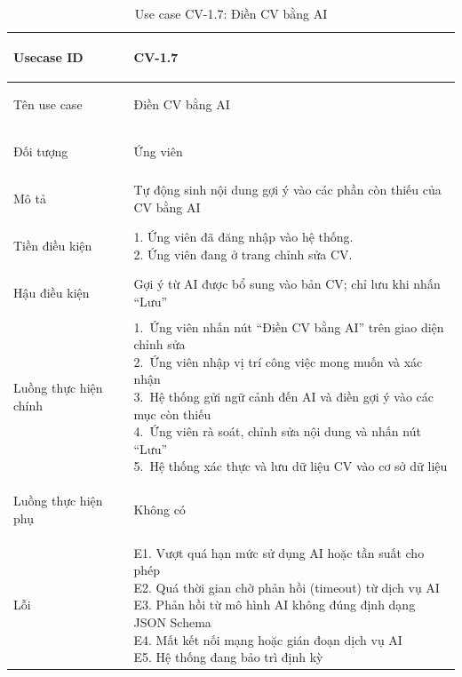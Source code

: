 \begin{table}[H]
    \centering
    \small
    \renewcommand{\arraystretch}{0.90}
    \begin{tabularx}{\textwidth}{|
        >{\bfseries\raggedright\arraybackslash}p{2.6cm}|Y|}
        \hline

        Usecase ID & CV-1.7 \\ \hline

        Tên use case & Điền CV bằng AI \\ \hline

        Đối tượng & Ứng viên \\ \hline

        Mô tả & Tự động sinh nội dung gợi ý vào các phần còn thiếu của CV bằng AI \\ \hline

        Tiền điều kiện &
        \parbox[t]{\hsize}{
            1. Ứng viên đã đăng nhập vào hệ thống.\\
            2. Ứng viên đang ở trang chỉnh sửa CV.
        } \\
        \hline

        Hậu điều kiện & Gợi ý từ AI được bổ sung vào bản CV; chỉ lưu khi nhấn ``Lưu'' \\ \hline

        Luồng thực hiện chính &
        \parbox[t]{\hsize}{
            1.\ Ứng viên nhấn nút ``Điền CV bằng AI'' trên giao diện chỉnh sửa\\
            2.\ Ứng viên nhập vị trí công việc mong muốn và xác nhận\\
            3.\ Hệ thống gửi ngữ cảnh đến AI và điền gợi ý vào các mục còn thiếu\\
            4.\ Ứng viên rà soát, chỉnh sửa nội dung và nhấn nút ``Lưu''\\
            5.\ Hệ thống xác thực và lưu dữ liệu CV vào cơ sở dữ liệu
        }\\
        \hline

        Luồng thực hiện phụ & Không có \\
        \hline

        Lỗi &
        \parbox[t]{\hsize}{
            E1. Vượt quá hạn mức sử dụng AI hoặc tần suất cho phép\\
            E2. Quá thời gian chờ phản hồi (timeout) từ dịch vụ AI\\
            E3. Phản hồi từ mô hình AI không đúng định dạng JSON Schema\\
            E4. Mất kết nối mạng hoặc gián đoạn dịch vụ AI\\
            E5. Hệ thống đang bảo trì định kỳ
        }\\
        \hline

    \end{tabularx}
    \caption{Use case CV-1.7: Điền CV bằng AI}
    \label{tab:usecase-cv17}
\end{table}

